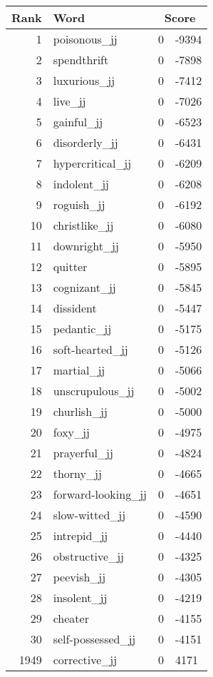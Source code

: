 \begin{longtable}[!htbp]{| rlr@{.}l |}
    \hline
    \textbf{Rank} & \textbf{Word} & \multicolumn{2}{c|}{\textbf{Score}} \\
    \hline
    \endhead
    1 & poisonous\_jj & 0 & -9394 \\
    2 & spendthrift & 0 & -7898 \\
    3 & luxurious\_jj & 0 & -7412 \\
    4 & live\_jj & 0 & -7026 \\
    5 & gainful\_jj & 0 & -6523 \\
    6 & disorderly\_jj & 0 & -6431 \\
    7 & hypercritical\_jj & 0 & -6209 \\
    8 & indolent\_jj & 0 & -6208 \\
    9 & roguish\_jj & 0 & -6192 \\
    10 & christlike\_jj & 0 & -6080 \\
    11 & downright\_jj & 0 & -5950 \\
    12 & quitter & 0 & -5895 \\
    13 & cognizant\_jj & 0 & -5845 \\
    14 & dissident & 0 & -5447 \\
    15 & pedantic\_jj & 0 & -5175 \\
    16 & soft-hearted\_jj & 0 & -5126 \\
    17 & martial\_jj & 0 & -5066 \\
    18 & unscrupulous\_jj & 0 & -5002 \\
    19 & churlish\_jj & 0 & -5000 \\
    20 & foxy\_jj & 0 & -4975 \\
    21 & prayerful\_jj & 0 & -4824 \\
    22 & thorny\_jj & 0 & -4665 \\
    23 & forward-looking\_jj & 0 & -4651 \\
    24 & slow-witted\_jj & 0 & -4590 \\
    25 & intrepid\_jj & 0 & -4440 \\
    26 & obstructive\_jj & 0 & -4325 \\
    27 & peevish\_jj & 0 & -4305 \\
    28 & insolent\_jj & 0 & -4219 \\
    29 & cheater & 0 & -4155 \\
    30 & self-possessed\_jj & 0 & -4151 \\
    1949 & corrective\_jj & 0 & 4171 \\

\end{longtable}
